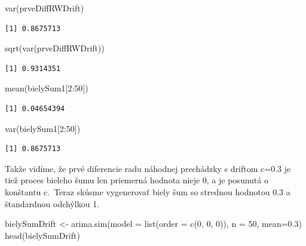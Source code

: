 \documentclass[
  letterpaper,
  DIV=11,
  numbers=noendperiod]{scrreprt}
\newenvironment{Shaded}{\begin{snugshade}}{\end{snugshade}}
\newcommand{\AttributeTok}[1]{\textcolor[rgb]{0.40,0.45,0.13}{#1}}
\newcommand{\DecValTok}[1]{\textcolor[rgb]{0.68,0.00,0.00}{#1}}
\newcommand{\FloatTok}[1]{\textcolor[rgb]{0.68,0.00,0.00}{#1}}
\newcommand{\FunctionTok}[1]{\textcolor[rgb]{0.28,0.35,0.67}{#1}}
\newcommand{\NormalTok}[1]{\textcolor[rgb]{0.00,0.23,0.31}{#1}}
\newcommand{\OtherTok}[1]{\textcolor[rgb]{0.00,0.23,0.31}{#1}}
\newcommand{\SpecialCharTok}[1]{\textcolor[rgb]{0.37,0.37,0.37}{#1}}
\begin{document}
\begin{Shaded}
\begin{Highlighting}[]
\FunctionTok{var}\NormalTok{(prveDiffRWDrift)}
\end{Highlighting}
\end{Shaded}

\begin{verbatim}
[1] 0.8675713
\end{verbatim}

\begin{Shaded}
\begin{Highlighting}[]
\FunctionTok{sqrt}\NormalTok{(}\FunctionTok{var}\NormalTok{(prveDiffRWDrift))}
\end{Highlighting}
\end{Shaded}

\begin{verbatim}
[1] 0.9314351
\end{verbatim}

\begin{Shaded}
\begin{Highlighting}[]
\FunctionTok{mean}\NormalTok{(bielySum1[}\DecValTok{2}\SpecialCharTok{:}\DecValTok{50}\NormalTok{])}
\end{Highlighting}
\end{Shaded}

\begin{verbatim}
[1] 0.04654394
\end{verbatim}

\begin{Shaded}
\begin{Highlighting}[]
\FunctionTok{var}\NormalTok{(bielySum1[}\DecValTok{2}\SpecialCharTok{:}\DecValTok{50}\NormalTok{])}
\end{Highlighting}
\end{Shaded}

\begin{verbatim}
[1] 0.8675713
\end{verbatim}

Takže vidíme, že prvé diferencie radu náhodnej prechádzky s driftom
c=0.3 je tiež proces bieleho šumu len priemerná hodnota nieje 0, a je
posunutá o konštantu c.~Teraz skúsme vygenerovať biely šum so strednou
hodnotou 0.3 a štandardnou odchýlkou 1.

\begin{Shaded}
\begin{Highlighting}[]
\NormalTok{bielySumDrift }\OtherTok{\textless{}{-}} \FunctionTok{arima.sim}\NormalTok{(}\AttributeTok{model =} \FunctionTok{list}\NormalTok{(}\AttributeTok{order =} \FunctionTok{c}\NormalTok{(}\DecValTok{0}\NormalTok{, }\DecValTok{0}\NormalTok{, }\DecValTok{0}\NormalTok{)), }\AttributeTok{n =} \DecValTok{50}\NormalTok{, }\AttributeTok{mean=}\FloatTok{0.3}\NormalTok{)}
\FunctionTok{head}\NormalTok{(bielySumDrift)}
\end{Highlighting}
\end{Shaded}
\end{document}
